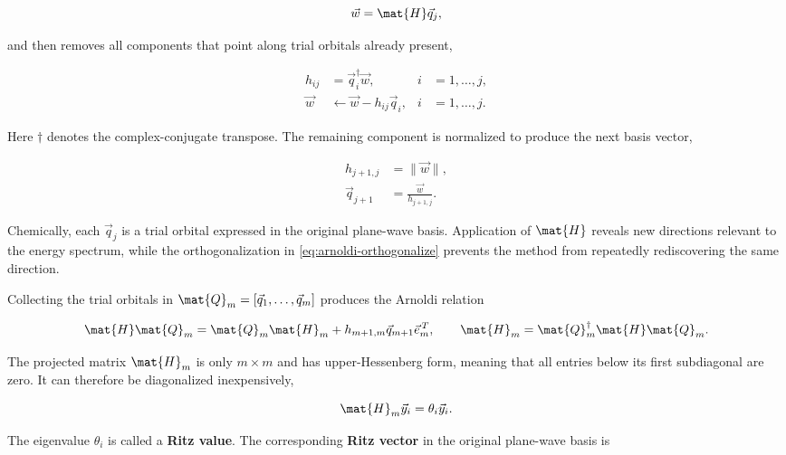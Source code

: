\begin{equation}
    \vec{w}=\mat{H}\vec{q}_{j},
\end{equation}

and then removes all components that point along trial orbitals already present,

\begin{align}
    h_{ij} &= \vec{q}_{i}^{\dagger}\vec{w}, & i&=1,\ldots,j,\\
    \vec{w} &\leftarrow \vec{w}-h_{ij}\vec{q}_{i}, & i&=1,\ldots,j.
    \label{eq:arnoldi-orthogonalize}
\end{align}

Here \(\dagger\) denotes the complex-conjugate transpose. The remaining component is normalized to produce the next basis vector,

\begin{align}
    h_{j+1,j} &= \|\vec{w}\|,\\
    \vec{q}_{j+1} &= \frac{\vec{w}}{h_{j+1,j}}.
    \label{eq:arnoldi-normalize}
\end{align}

Chemically, each \(\vec{q}_{j}\) is a trial orbital expressed in the original plane-wave basis. Application of \(\mat{H}\) reveals new directions relevant to the energy spectrum, while the orthogonalization in \cref{eq:arnoldi-orthogonalize} prevents the method from repeatedly rediscovering the same direction.

Collecting the trial orbitals in \(\mat{Q}_{m}=[\vec{q}_{1},\ldots,\vec{q}_{m}]\) produces the Arnoldi relation

\begin{equation}
    \mat{H}\mat{Q}_{m}
    = \mat{Q}_{m}\mat{H}_{m}
    +h_{m+1,m}\vec{q}_{m+1}\vec{e}_{m}^{\,T},
    \qquad
    \mat{H}_{m}=\mat{Q}_{m}^{\dagger}\mat{H}\mat{Q}_{m}.
    \label{eq:arnoldi-relation}
\end{equation}

The projected matrix \(\mat{H}_{m}\) is only \(m\times m\) and has upper-Hessenberg form, meaning that all entries below its first subdiagonal are zero. It can therefore be diagonalized inexpensively,

\begin{equation}
    \mat{H}_{m}\vec{y}_{i}=\theta_{i}\vec{y}_{i}.
    \label{eq:ritz-small}
\end{equation}

The eigenvalue \(\theta_i\) is called a \textbf{Ritz value}. The corresponding \textbf{Ritz vector} in the original plane-wave basis is


